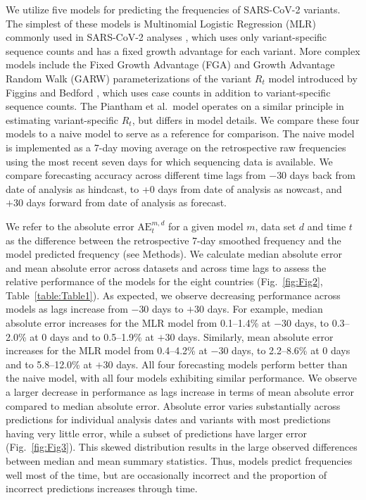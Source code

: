 \documentclass[10pt,letterpaper]{article}
\begin{document}
We utilize five models for predicting the frequencies of SARS-CoV-2 variants.
The simplest of these models is Multinomial Logistic Regression (MLR) commonly used in SARS-CoV-2 analyses \cite{annavajhala2021emergence, faria2021genomics, obermeyer2022analysis, susswein2023early}, which uses only variant-specific sequence counts and has a fixed growth advantage for each variant.
More complex models include the Fixed Growth Advantage (FGA) and Growth Advantage Random Walk (GARW) parameterizations of the variant $R_t$ model introduced by Figgins and Bedford \cite{figgins2022sars}, which uses case counts in addition to variant-specific sequence counts.
The Piantham et al.\ model \cite{piantham2021estimating} operates on a similar principle in estimating variant-specific $R_t$, but differs in model details.
We compare these four models to a naive model to serve as a reference for comparison.
The naive model is implemented as a 7-day moving average on the retrospective raw frequencies using the most recent seven days for which sequencing data is available.
We compare forecasting accuracy across different time lags from $-30$ days back from date of analysis as hindcast, to +0 days from date of analysis as nowcast, and $+30$ days forward from date of analysis as forecast.


We refer to the absolute error $\mathrm{AE}_{t}^{m,d}$ for a given model $m$, data set $d$ and time $t$ as the difference between the retrospective 7-day smoothed frequency and the model predicted frequency (see Methods).
We calculate median absolute error and mean absolute error across datasets and across time lags to assess the relative performance of the models for the eight countries (Fig.~\ref{fig:Fig2}, Table~\ref{table:Table1}).
As expected, we observe decreasing performance across models as lags increase from $-30$ days to $+30$ days.
For example, median absolute error increases for the MLR model from 0.1--1.4\% at $-30$ days, to 0.3--2.0\% at 0 days and to 0.5--1.9\% at $+30$ days.
Similarly, mean absolute error increases for the MLR model from 0.4--4.2\% at $-30$ days, to 2.2--8.6\% at 0 days and to 5.8--12.0\% at $+30$ days.
All four forecasting models perform better than the naive model, with all four models exhibiting similar performance.
We observe a larger decrease in performance as lags increase in terms of mean absolute error compared to median absolute error.
Absolute error varies substantially across predictions for individual analysis dates and variants with most predictions having very little error, while a subset of predictions have larger error (Fig.~\ref{fig:Fig3}).
This skewed distribution results in the large observed differences between median and mean summary statistics.
Thus, models predict frequencies well most of the time, but are occasionally incorrect and the proportion of incorrect predictions increases through time.
\end{document}
